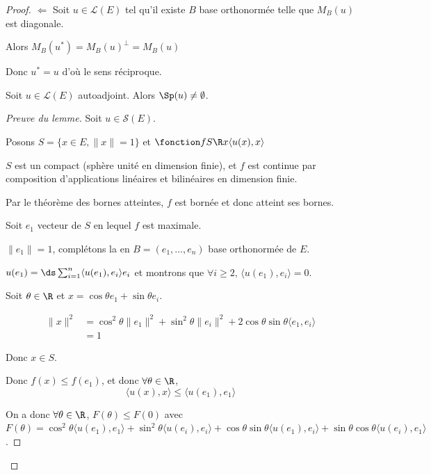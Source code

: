 \begin{proof}
    $\Leftarrow$ Soit $u \in \mathscr L(E)$ tel qu'il existe $B$ base orthonormée 
    telle que $M_B(u)$ est diagonale. 

    Alors $M_B(u^*) = M_B(u)^\perp = M_B(u)$

    Donc $u^* = u$ d'où le sens réciproque. 

     Soit $u \in \mathscr L(E)$ autoadjoint. Alors 
    $\Sp(u) \neq \emptyset$. 

    \avspace 

    \begin{proof}[Preuve du lemme]
    Soit $u \in \mathscr S(E)$. 

    Posons $S = \{x \in E, \| x \| = 1\}$ et 
    $\fonction f S \R x {\langle u(x), x \rangle}$

    $S$ est un compact (sphère unité en dimension finie), et $f$ est 
    continue par composition d'applications linéaires et bilinéaires en dimension finie. 

    Par le théorème des bornes atteintes, $f$ est bornée et donc atteint ses bornes. 

    Soit $e_1$ vecteur de $S$ en lequel $f$ est maximale. 

    $\| e_1 \| = 1$, complétons la en $B = (e_1, \dots, e_n)$ base orthonormée de $E$.

    $u(e_1) = \ds \sum_{i = 1}^{n } \langle u(e_1), e_i \rangle e_i$ et 
    montrons que $\forall i \geqslant 2, \, \langle u(e_1), e_i \rangle = 0$.

    Soit $\theta \in \R$ et $x = \cos \theta e_1 + \sin \theta e_i$. 

    \begin{align}
        \| x \|^2 & = \cos^2 \theta \| e_1 \|^2 + \sin^2 \theta \| e_i \|^2 + 2 \cos \theta \sin \theta \langle e_1, e_i \rangle \\
        & = 1
    \end{align} 

    Donc $x \in S$. 

    Donc $f(x) \leqslant f(e_1)$, et donc $\forall \theta \in \R$, 
    $$\langle u (x), x \rangle \leqslant \langle u(e_1), e_1 \rangle$$

    On a donc $\forall \theta \in \R$, $F(\theta) \leqslant F(0)$ avec 
    $F(\theta) = \cos^2 \theta \langle u(e_1), e_1 \rangle + \sin^2 \theta \langle u(e_i), e_i \rangle + \cos \theta \sin \theta \langle u(e_1), e_i \rangle + \sin \theta \cos \theta \langle u(e_i), e_1 \rangle$.


\end{proof}
\end{proof}
